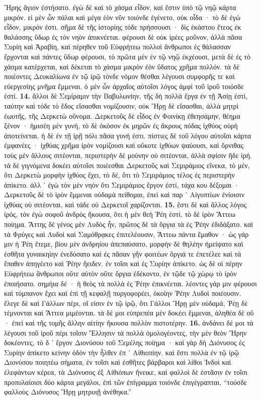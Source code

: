 \documentclass[a4paper, 11pt, oneside, polutonikogreek, german]{article}
\begin{document}
Ἥρης ἅγιον ἐστήσατο. ἐγὼ δὲ καὶ τὸ χάσμα εἶδον, καὶ ἔστιν ὑπὸ τῷ νηῷ κάρτα μικρόν. εἰ μὲν ὦν πάλαι καὶ μέγα ἐὸν νῦν τοιόνδε ἐγένετο, οὐκ οἶδα · τὸ δὲ ἐγὼ εἶδον, μικρόν ἐστι. σῆμα δὲ τῆς ἱστορίης τόδε πρήσσουσι · δὶς ἑκάστου ἔτεος ἐκ θαλάσσης ὕδωρ ἐς τὸν νηὸν ἀπικνέεται. φέρουσι δὲ οὐκ ἱρέες μοῦνον, ἀλλὰ πᾶσα Συρίη καὶ Ἀραβίη, καὶ πέρηθεν τοῦ Εὐφρήτεω πολλοὶ ἄνθρωποι ἐς θάλασσαν ἔρχονται καὶ πάντες ὕδωρ φέρουσι, τὸ πρῶτα μὲν ἐν τῷ νηῷ ἐκχέουσι, μετὰ δὲ ἐς τὸ χάσμα κατέρχεται, καὶ δέκεται τὸ χάσμα μικρὸν ἐὸν ὕδατος χρῆμα πολλόν. τὰ δὲ ποιέοντες Δευκαλίωνα ἐν τῷ ἱρῷ τόνδε νόμον θέσθαι λέγουσι συμφορῆς τε καὶ εὐεργεσίης μνῆμα ἔμμεναι. ὁ μὲν ὦν ἀρχαῖος αὐτοῖσι λόγος ἀμφὶ τοῦ ἱροῦ τοιόσδε ἐστί. \textbf{14.} ἄλλοι δὲ Σεμίραμιν τὴν Βαβυλωνίην, τῆς δὴ πολλὰ ἔργα ἐν τῇ Ἀσίῃ ἐστί, ταύτην καὶ τόδε τὸ ἕδος εἵσασθαι νομίζουσιν, οὐκ Ἥρῃ δὲ εἵσασθαι, ἀλλὰ μητρὶ ἑωυτῆς, τῆς Δερκετὼ οὔνομα. Δερκετοῦς δὲ εἶδος ἐν Φοινίκῃ ἐθεησάμην, θέημα ξένον · ἡμισέη μὲν γυνή, τὸ δὲ ὁκόσον ἐκ μηρῶν ἐς ἄκρους πόδας ἰχθύος οὐρὴ ἀποτείνεται. ἡ δὲ ἐν τῇ ἱρῇ πόλι πᾶσα γυνή ἐστι. πίστιες δὲ τοῦ λόγου αὐτοῖσι κάρτα ἐμφανέες · ἰχθύας χρῆμα ἱρὸν νομίζουσι καὶ οὔκοτε ἰχθύων ψαύουσι, καὶ ὄρνιθας τοὺς μὲν ἄλλους σιτέονται, περιστερὴν δὲ μούνην οὐ σιτέονται, ἀλλὰ σφίσιν ἥδε ἱρή. τὰ δὲ γιγνόμενα δοκέει αὐτοῖσι ποιέεσθαι Δερκετοῦς καὶ Σεμιράμιος εἵνεκα, τὸ μέν, ὅτι Δερκετὼ μορφὴν ἰχθύος ἔχει, τὸ δέ, ὅτι τὸ Σεμιράμιος τέλος ἐς περιστερὴν ἀπίκετο. ἀλλ ᾽ ἐγὼ τὸν μὲν νηὸν ὅτι Σεμιράμιος ἔργον ἐστί, τάχα κου δέξομαι · Δερκετοῦς δὲ τὸ ἱρὸν ἔμμεναι οὐδαμὰ πείθομαι, ἐπεὶ καὶ παρ ᾽ Αἰγυπτίων ἐνίοισιν ἰχθύας οὐ σιτέονται, καὶ τάδε οὐ Δερκετοῖ χαρίζονται. \textbf{15.} ἔστι δὲ καὶ ἄλλος λόγος ἱρός, τὸν ἐγὼ σοφοῦ ἀνδρὸς ἤκουσα, ὅτι ἡ μὲν θεὴ Ῥέη ἐστί, τὸ δὲ ἱρὸν Ἄττεω ποίημα. Ἄττης δὲ γένος μὲν Λυδὸς ἦν, πρῶτος δὲ τὰ ὄργια τὰ ἐς Ῥέην ἐδιδάξατο. καὶ τὰ Φρύγες καὶ Λυδοὶ καὶ Σαμόθρᾳκες ἐπιτελέουσιν, Ἄττεω πάντα ἔμαθον · ὡς γάρ μιν ἡ Ῥέη ἔτεμε, βίου μὲν ἀνδρηίου ἀπεπαύσατο, μορφὴν δὲ θηλέην ἠμείψατο καὶ ἐσθῆτα γυναικηίην ἐνεδύσατο καὶ ἐς πᾶσαν γῆν φοιτέων ὄργιά τε ἐπετέλεε καὶ τὰ ἔπαθεν ἀπηγέετο καὶ Ῥέην ἤειδεν. ἐν  τοῖσι καὶ ἐς Συρίην ἀπίκετο. ὡς δὲ οἱ πέρην Εὐφρήτεω ἄνθρωποι οὔτε αὐτὸν οὔτε ὄργια ἐδέκοντο, ἐν τῷδε τῷ χώρῳ τὸ ἱρὸν ἐποιήσατο. σημήια δέ · ἡ θεὸς τὰ πολλὰ ἐς Ῥέην ἐπικνέεται. λέοντες γάρ μιν φέρουσι καὶ τύμπανον ἔχει καὶ ἐπὶ τῇ κεφαλῇ πυργοφορέει, ὁκοίην Ῥέην Λυδοὶ ποιέουσιν. ἔλεγε δὲ καὶ Γάλλων πέρι, οἵ εἰσιν ἐν τῷ ἱρῷ, ὅτι Γάλλοι Ἥρῃ μὲν οὐδαμά, Ῥέῃ δὲ τέμνονται καὶ Ἄττεα μιμέονται. τὰ δέ μοι εὐπρεπέα μὲν δοκέει ἔμμεναι, ἀληθέα δὲ οὔ · ἐπεὶ καὶ τῆς τομῆς ἄλλην αἰτίην ἤκουσα πολλὸν πιστοτέρην. \textbf{16.} ἁνδάνει δέ μοι τὰ λέγουσι τοῦ ἱροῦ πέρι τοῖσιν Ἕλλησιν τὰ πολλὰ ὁμολογέοντες, τὴν μὲν θεὸν Ἥρην δοκέοντες, τὸ δ ᾽ ἔργον Διονύσου τοῦ Σεμέλης ποίημα · καὶ γὰρ δὴ Διόνυσος ἐς Συρίην ἀπίκετο κείνην ὁδὸν τὴν ἦλθεν ἐπ ᾽ Αἰθιοπίην. καὶ ἔστι πολλὰ ἐν τῷ ἱρῷ Διονύσου ποιητέω σήματα, ἐν τοῖσι καὶ ἐσθῆτες βάρβαροι καὶ λίθοι Ἰνδοὶ καὶ ἐλεφάντων κέρεα, τὰ Διόνυσος ἐξ Αἰθιόπων ἤνεικε, καὶ φαλλοὶ δὲ ἑστᾶσιν ἐν τοῖσι προπυλαίοισι δύο κάρτα μεγάλοι, ἐπὶ τῶν ἐπίγραμμα τοιόνδε ἐπιγέγραπται, "`τούσδε φαλλοὺς Διόνυσος Ἥρῃ μητρυιῇ ἀνέθηκα."'
\end{document}
